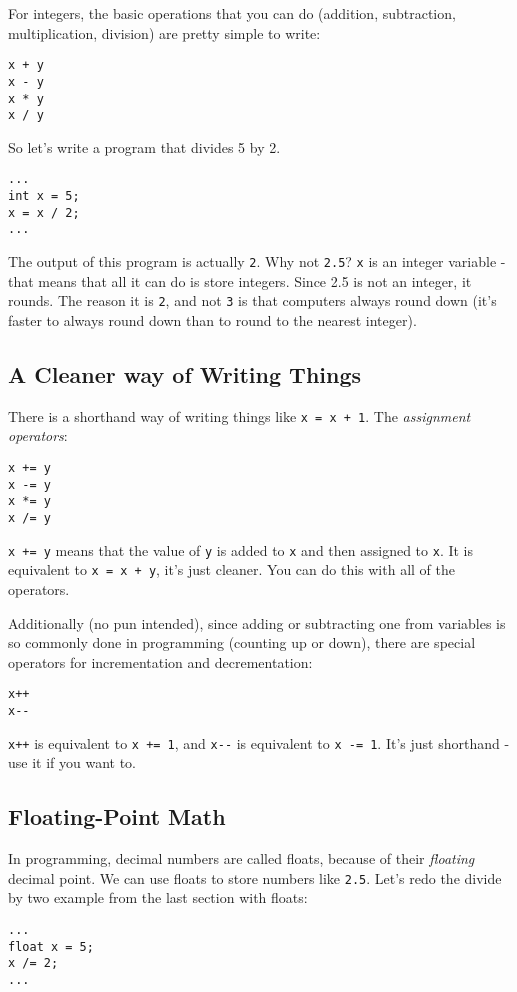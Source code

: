 \documentclass[10pt,a4paper]{article}
\begin{document}
For integers, the basic operations that you can do (addition, subtraction, multiplication, division) are pretty simple to write:
\begin{verbatim}
x + y
x - y
x * y
x / y
\end{verbatim}

So let's write a program that divides 5 by 2.
\begin{verbatim}
...
int x = 5;
x = x / 2;
...
\end{verbatim}

The output of this program is actually \verb|2|. Why not \verb|2.5|? \verb|x| is an integer variable - that means that all it can do is store integers. Since 2.5 is not an integer, it rounds. The reason it is \verb|2|, and not \verb|3| is that computers always round down (it's faster to always round down than to round to the nearest integer). 

\newpage





\subsection{A Cleaner way of Writing Things}
There is a shorthand way of writing things like \verb|x = x + 1|. The \textit{assignment operators}:
\begin{verbatim}
x += y
x -= y
x *= y
x /= y
\end{verbatim}

\verb|x += y| means that the value of \verb|y| is added to \verb|x| and then assigned to \verb|x|. It is equivalent to \verb|x = x + y|, it's just cleaner. You can do this with all of the operators.

Additionally (no pun intended), since adding or subtracting one from variables is so commonly done in programming (counting up or down), there are special operators for incrementation and decrementation:
\begin{verbatim}
x++
x--
\end{verbatim}

\verb|x++| is equivalent to \verb|x += 1|, and \verb|x--| is equivalent to \verb|x -= 1|. It's just shorthand - use it if you want to.

\newpage





\subsection{Floating-Point Math}
In programming, decimal numbers are called floats, because of their \textit{floating} decimal point. We can use floats to store numbers like \verb|2.5|. Let's redo the divide by two example from the last section with floats:
\begin{verbatim}
...
float x = 5;
x /= 2;
...
\end{verbatim}
\end{document}
